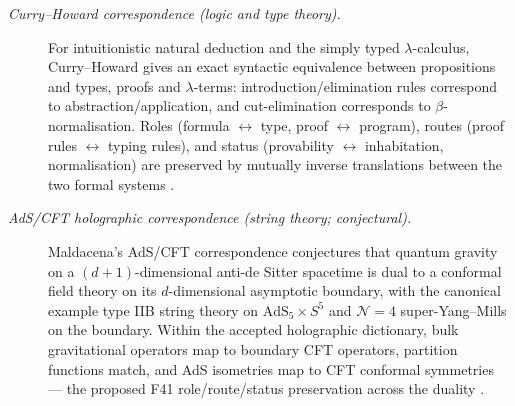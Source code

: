\documentclass[11pt]{article}
\theoremstyle{definition}
\begin{document}
\begin{description}
\item[\emph{Curry--Howard correspondence (logic and type theory).}]
For intuitionistic natural deduction and the simply typed
\(\lambda\)-calculus, Curry--Howard gives an exact syntactic
equivalence between propositions and types, proofs and
\(\lambda\)-terms: introduction/elimination rules correspond to
abstraction/application, and cut-elimination corresponds to
\(\beta\)-normalisation.  Roles (formula \(\leftrightarrow\) type,
proof \(\leftrightarrow\) program), routes (proof rules
\(\leftrightarrow\) typing rules), and status (provability
\(\leftrightarrow\) inhabitation, normalisation) are preserved by
mutually inverse translations between the two formal systems
\citep{Howard1980FormulaeAsTypes}.

\item[\emph{{AdS}/{CFT} holographic correspondence (string
theory; conjectural).}]
Maldacena's AdS/CFT correspondence conjectures that quantum gravity
on a \((d+1)\)-dimensional anti-de Sitter spacetime is dual to a
conformal field theory on its \(d\)-dimensional asymptotic
boundary, with the canonical example type IIB string theory on
\(\mathrm{AdS}_5\times S^5\) and \(\mathcal N=4\) super-Yang--Mills
on the boundary.  Within the accepted holographic dictionary, bulk
gravitational operators map to boundary CFT operators, partition
functions match, and AdS isometries map to CFT conformal
symmetries --- the proposed F41 role/route/status preservation
across the duality
\citep{Maldacena1998LargeNSuperconformal}.
\end{description}
\end{document}
